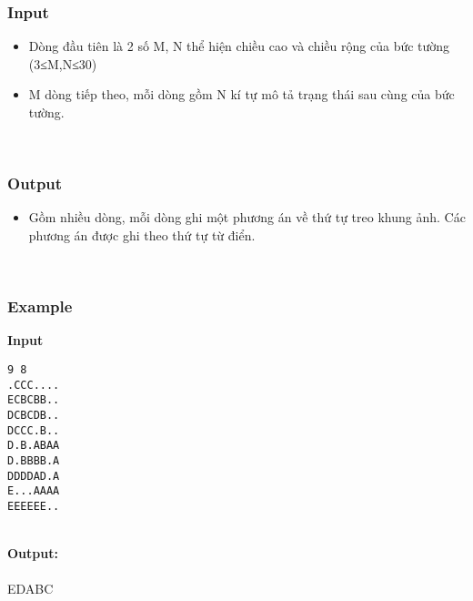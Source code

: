 \subsubsection{Input}
\begin{itemize}
	\item Dòng đầu tiên là 2 số M, N thể hiện chiều cao và chiều rộng của bức tường (3≤M,N≤30)
	\item M dòng tiếp theo, mỗi dòng gồm N kí tự mô tả trạng thái sau cùng của bức tường.
\end{itemize}

 

\subsubsection{Output}
\begin{itemize}
	\item Gồm nhiều dòng, mỗi dòng ghi một phương án về thứ tự treo khung ảnh. Các phương án được ghi theo thứ tự từ điển.
\end{itemize}

 

\subsubsection{Example}

\textbf{Input}
\begin{verbatim}
9 8
.CCC....
ECBCBB..
DCBCDB..
DCCC.B..
D.B.ABAA
D.BBBB.A
DDDDAD.A
E...AAAA
EEEEEE..
\end{verbatim}


\\\textbf{Output:}
\\
\\EDABC

 